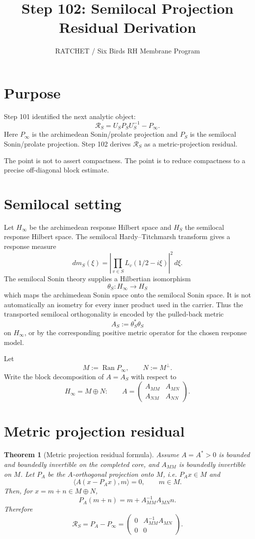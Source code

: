 \documentclass[11pt]{article}
\title{Step 102: Semilocal Projection Residual Derivation}
\author{RATCHET / Six Birds RH Membrane Program}
\date{}
\newtheorem{theorem}{Theorem}
\begin{document}
\maketitle

\section{Purpose}

Step 101 identified the next analytic object:
\[
\mathcal R_S=U_SP_SU_S^{-1}-P_\infty .
\]
Here \(P_\infty\) is the archimedean Sonin/prolate projection and
\(P_S\) is the semilocal Sonin/prolate projection.  Step 102 derives
\(\mathcal R_S\) as a metric-projection residual.

The point is not to assert compactness. The point is to reduce compactness to
a precise off-diagonal block estimate.

\section{Semilocal setting}

Let \(H_\infty\) be the archimedean response Hilbert space and \(H_S\) the
semilocal response Hilbert space.  The semilocal Hardy--Titchmarsh transform
gives a response measure
\[
dm_S(\xi)=\left|\prod_{v\in S}L_v(1/2-i\xi)\right|^2\,d\xi.
\]
The semilocal Sonin theory supplies a Hilbertian isomorphism
\[
\theta_S:H_\infty\to H_S
\]
which maps the archimedean Sonin space onto the semilocal Sonin space.  It is
not automatically an isometry for every inner product used in the carrier.
Thus the transported semilocal orthogonality is encoded by the pulled-back
metric
\[
A_S:=\theta_S^*\theta_S
\]
on \(H_\infty\), or by the corresponding positive metric operator for the
chosen response model.

Let
\[
M:=\operatorname{Ran}P_\infty,\qquad N:=M^\perp.
\]
Write the block decomposition of \(A=A_S\) with respect to
\[
H_\infty=M\oplus N:
\qquad
A=
\begin{pmatrix}
A_{MM}&A_{MN}\\
A_{NM}&A_{NN}
\end{pmatrix}.
\]

\section{Metric projection residual}

\begin{theorem}[Metric projection residual formula]
Assume \(A=A^*>0\) is bounded and boundedly invertible on the completed core,
and \(A_{MM}\) is boundedly invertible on \(M\).  Let \(P_A\) be the
\(A\)-orthogonal projection onto \(M\), i.e. \(P_Ax\in M\) and
\[
\langle A(x-P_Ax),m\rangle=0,\qquad m\in M.
\]
Then, for \(x=m+n\in M\oplus N\),
\[
P_A(m+n)=m+A_{MM}^{-1}A_{MN}n.
\]
Therefore
\[
\boxed{
\mathcal R_S=P_A-P_\infty
=
\begin{pmatrix}
0&A_{MM}^{-1}A_{MN}\\
0&0
\end{pmatrix}.
}
\]
\end{theorem}
\end{document}
